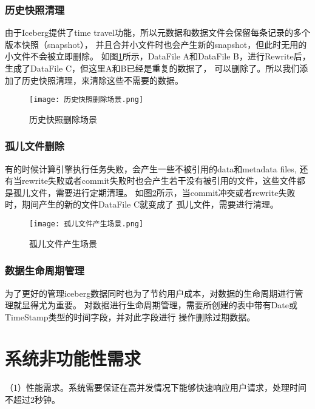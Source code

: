 \subsubsection{历史快照清理}

由于Iceberg提供了time travel功能，所以元数据和数据文件会保留每条记录的多个版本快照（snapshot），
并且合并小文件时也会产生新的snapshot，但此时无用的小文件不会被立即删除。
如图\ref{fig:历史快照删除场景}所示，DataFile A和DataFile B，进行Rewrite后，生成了DataFile C，但这里A和B已经是重复的数据了，
可以删除了。所以我们添加了历史快照清理，来清除这些不需要的数据。

\begin{figure}[H]
  \centering
  \texttt{[image: 历史快照删除场景.png]}
  \caption{历史快照删除场景}
  \label{fig:历史快照删除场景}
\end{figure}

\subsubsection{孤儿文件删除}

有的时候计算引擎执行任务失败，会产生一些不被引用的data和metadata files,
还有当rewrite失败或者commit失败时也会产生若干没有被引用的文件，这些文件都是孤儿文件，需要进行定期清理。
如图\ref{fig:孤儿文件产生场景}所示，当commit冲突或者rewrite失败时，期间产生的新的文件DataFile C就变成了
孤儿文件，需要进行清理。

\begin{figure}[H]
  \centering
  \texttt{[image: 孤儿文件产生场景.png]}
  \caption{孤儿文件产生场景}
  \label{fig:孤儿文件产生场景}
\end{figure}

\subsubsection{数据生命周期管理}

为了更好的管理iceberg数据同时也为了节约用户成本，对数据的生命周期进行管理就显得尤为重要\cite{36}。
对数据进行生命周期管理，需要所创建的表中带有Date或TimeStamp类型的时间字段，并对此字段进行
操作删除过期数据。

\section{系统非功能性需求}

（1）性能需求。系统需要保证在高并发情况下能够快速响应用户请求，处理时间不超过2秒钟。

